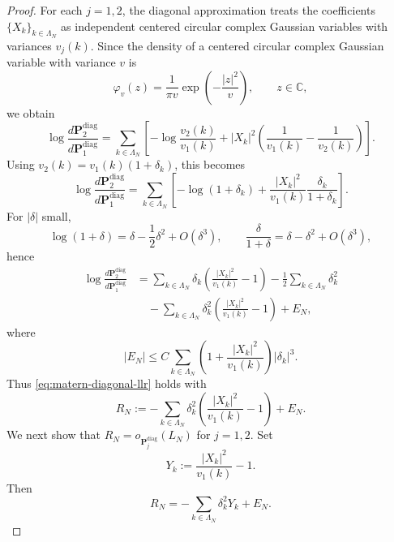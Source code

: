 \documentclass[10pt,a4paper]{amsart}
\begin{document}
\begin{proof}
For each \(j=1,2\), the diagonal approximation treats the coefficients
\(\{X_k\}_{k\in\Lambda_N}\) as independent centered circular complex Gaussian
variables with variances \(v_j(k)\). Since the density of a centered circular
complex Gaussian variable with variance \(v\) is
\[
\varphi_v(z)=\frac1{\pi v}\exp\!\left(-\frac{|z|^2}{v}\right), \qquad z\in\mathbb C,
\]
we obtain
\[
\log\frac{d\mathbf P_2^{\mathrm{diag}}}{d\mathbf P_1^{\mathrm{diag}}}
=
\sum_{k\in\Lambda_N}
\left[
-\log\frac{v_2(k)}{v_1(k)}
+
|X_k|^2\left(\frac1{v_1(k)}-\frac1{v_2(k)}\right)
\right].
\]
Using \(v_2(k)=v_1(k)(1+\delta_k)\), this becomes
\[
\log\frac{d\mathbf P_2^{\mathrm{diag}}}{d\mathbf P_1^{\mathrm{diag}}}
=
\sum_{k\in\Lambda_N}
\left[
-\log(1+\delta_k)
+
\frac{|X_k|^2}{v_1(k)}\frac{\delta_k}{1+\delta_k}
\right].
\]
For \(|\delta|\) small,
\[
\log(1+\delta)=\delta-\frac12\delta^2+O(\delta^3),
\qquad
\frac{\delta}{1+\delta}=\delta-\delta^2+O(\delta^3),
\]
hence
\begin{align*}
\log\frac{d\mathbf P_2^{\mathrm{diag}}}{d\mathbf P_1^{\mathrm{diag}}}
&=
\sum_{k\in\Lambda_N}
\delta_k\left(\frac{|X_k|^2}{v_1(k)}-1\right)
-\frac12\sum_{k\in\Lambda_N}\delta_k^2 \\
&\quad
-\sum_{k\in\Lambda_N}\delta_k^2
\left(\frac{|X_k|^2}{v_1(k)}-1\right)
+
E_N,
\end{align*}
where
\[
|E_N|
\le
C\sum_{k\in\Lambda_N}
\left(1+\frac{|X_k|^2}{v_1(k)}\right)|\delta_k|^3.
\]
Thus \eqref{eq:matern-diagonal-llr} holds with
\[
R_N
:=
-\sum_{k\in\Lambda_N}\delta_k^2
\left(\frac{|X_k|^2}{v_1(k)}-1\right)
+
E_N.
\]
We next show that \(R_N=o_{\mathbf P_j^{\mathrm{diag}}}(L_N)\) for \(j=1,2\).
Set
\[
Y_k:=\frac{|X_k|^2}{v_1(k)}-1.
\]
Then
\[
R_N=-\sum_{k\in\Lambda_N}\delta_k^2Y_k+E_N.
\]


\end{proof}
\end{document}
